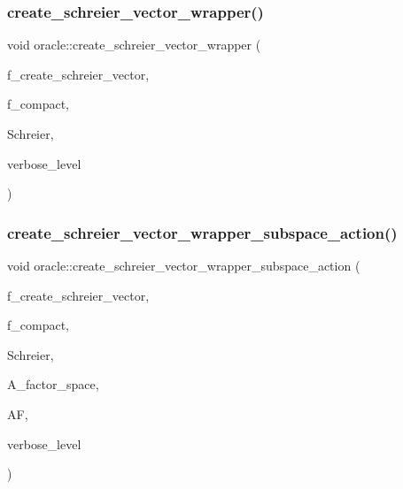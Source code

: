 \mbox{\label{classoracle_a634e453658cb00c01c6b09fb9e521289}} 
\subsubsection{\texorpdfstring{create\+\_\+schreier\+\_\+vector\+\_\+wrapper()}{create\_schreier\_vector\_wrapper()}}
{\footnotesize\ttfamily void oracle\+::create\+\_\+schreier\+\_\+vector\+\_\+wrapper (\begin{DoxyParamCaption}\item[{\mbox{\hyperlink{galois_8h_a09fddde158a3a20bd2dcadb609de11dc}{I\+NT}}}]{f\+\_\+create\+\_\+schreier\+\_\+vector,  }\item[{\mbox{\hyperlink{galois_8h_a09fddde158a3a20bd2dcadb609de11dc}{I\+NT}}}]{f\+\_\+compact,  }\item[{\mbox{\hyperlink{classschreier}{schreier}} \&}]{Schreier,  }\item[{\mbox{\hyperlink{galois_8h_a09fddde158a3a20bd2dcadb609de11dc}{I\+NT}}}]{verbose\+\_\+level }\end{DoxyParamCaption})}

\mbox{\label{classoracle_a250fe1c81f6109c01b0b030ccba537b3}} 
\subsubsection{\texorpdfstring{create\+\_\+schreier\+\_\+vector\+\_\+wrapper\+\_\+subspace\+\_\+action()}{create\_schreier\_vector\_wrapper\_subspace\_action()}}
{\footnotesize\ttfamily void oracle\+::create\+\_\+schreier\+\_\+vector\+\_\+wrapper\+\_\+subspace\+\_\+action (\begin{DoxyParamCaption}\item[{\mbox{\hyperlink{galois_8h_a09fddde158a3a20bd2dcadb609de11dc}{I\+NT}}}]{f\+\_\+create\+\_\+schreier\+\_\+vector,  }\item[{\mbox{\hyperlink{galois_8h_a09fddde158a3a20bd2dcadb609de11dc}{I\+NT}}}]{f\+\_\+compact,  }\item[{\mbox{\hyperlink{classschreier}{schreier}} \&}]{Schreier,  }\item[{\mbox{\hyperlink{classaction}{action}} $\ast$}]{A\+\_\+factor\+\_\+space,  }\item[{\mbox{\hyperlink{classaction__on__factor__space}{action\+\_\+on\+\_\+factor\+\_\+space}} $\ast$}]{AF,  }\item[{\mbox{\hyperlink{galois_8h_a09fddde158a3a20bd2dcadb609de11dc}{I\+NT}}}]{verbose\+\_\+level }\end{DoxyParamCaption})}

